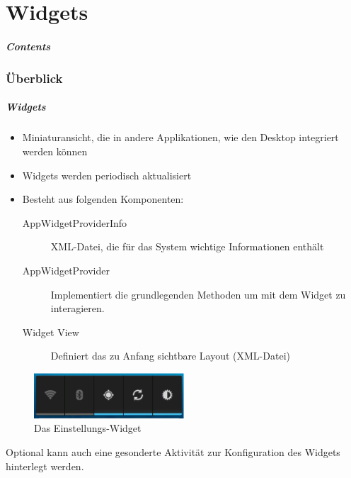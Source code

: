 \part{Widgets}
\frame{\partpage}
\begin{frame}
	\frametitle{Contents}
	\tableofcontents[]
\end{frame}

\section{Überblick}
\begin{frame}[label=widgets]
   \frametitle{Widgets}
   \begin{itemize}
      \item Miniaturansicht, die in andere Applikationen, wie den Desktop integriert werden können
      \item Widgets werden periodisch aktualisiert
      \item Besteht aus folgenden Komponenten:
         \begin{description}
            \item[AppWidgetProviderInfo] XML-Datei, die für das System wichtige Informationen enthält
            \item[AppWidgetProvider] Implementiert die grundlegenden Methoden 
               um mit dem Widget zu interagieren.
            \item[Widget View] Definiert das zu Anfang sichtbare Layout (XML-Datei)
         \end{description}
   \end{itemize}

   \begin{figure}[h!]
      \centering
      \includegraphics[width=0.5\textwidth]{pictures/widget.eps}
      \caption{Das Einstellungs-Widget}
      \label{fig:widget}
   \end{figure}

   Optional kann auch eine gesonderte Aktivität zur Konfiguration des 
   Widgets hinterlegt werden.
\end{frame}

